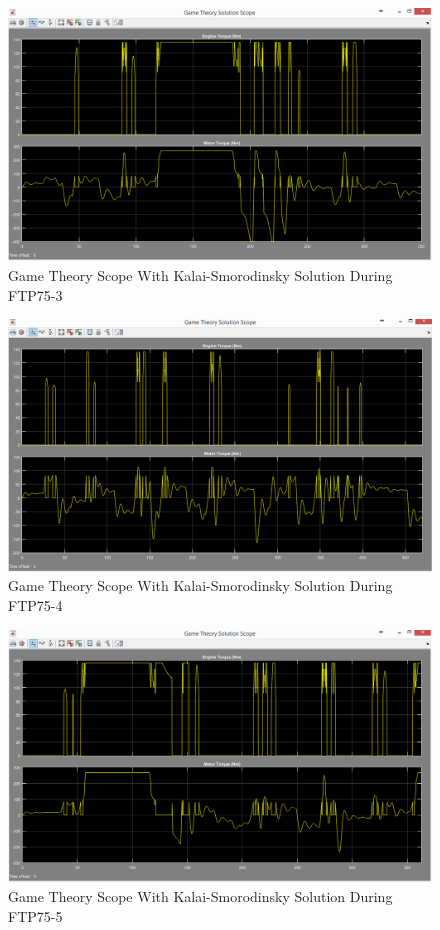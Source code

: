 \begin{figure}[h]
\centering
\includegraphics[scale=0.47]{figures/KalaiSmorodinsky/FTP75-3/gameTheory25Juni}
\caption{Game Theory Scope With Kalai-Smorodinsky Solution During FTP75-3}
\label{fig:gtks3}
\end{figure}

\begin{figure}[h]
\centering
\includegraphics[scale=0.47]{figures/KalaiSmorodinsky/FTP75-4/gameTheory25Juni}
\caption{Game Theory Scope With Kalai-Smorodinsky Solution During FTP75-4}
\label{fig:gtks4}
\end{figure}


\begin{figure}[h]
\centering
\includegraphics[scale=0.47]{figures/KalaiSmorodinsky/FTP75-5/gameTheory26Juni}
\caption{Game Theory Scope With Kalai-Smorodinsky Solution During FTP75-5}
\label{fig:gtks5}
\end{figure}
